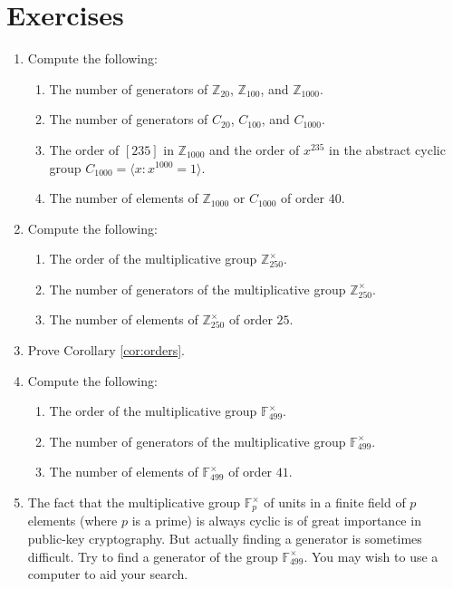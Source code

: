 \documentclass[11pt]{article}
\newenvironment{problems}
{
 \begin{enumerate}[topsep=1pt,itemsep=0pt,parsep=2pt,leftmargin=0.6cm,%
 label={\arabic*.}, ref=\arabic*] \small
}
{
 \end{enumerate}
}
\theoremstyle{definition}
\newcommand{\Z}{\mathbb{Z}} %
\newcommand{\F}{{\mathbb F}}
\newcommand{\gen}[1]{\langle #1 \rangle}
\begin{document}
\section*{Exercises}
\begin{problems}

\item Compute the following:
  \begin{enumerate}
  \item The number of generators of $\Z_{20}$, $\Z_{100}$, and
    $\Z_{1000}$.
  \item The number of generators of $C_{20}$, $C_{100}$, and
    $C_{1000}$.
  \item The order of $[235]$ in $\Z_{1000}$ and the order of $x^{235}$
    in the abstract cyclic group $C_{1000} = \gen{x: x^{1000} = 1}$.
  \item The number of elements of $\Z_{1000}$ or $C_{1000}$ of order
    $40$.
  \end{enumerate}

\item Compute the following:
  \begin{enumerate}
  \item The order of the multiplicative group $\Z_{250}^\times$.
  \item The number of generators of the multiplicative group
    $\Z_{250}^\times$.
  \item The number of elements of $\Z_{250}^\times$ of order $25$. 
  \end{enumerate}


\item Prove Corollary \ref{cor:orders}.

\item Compute the following:
  \begin{enumerate}
  \item The order of the multiplicative group $\F_{499}^\times$.
  \item The number of generators of the multiplicative group
    $\F_{499}^\times$.
  \item The number of elements of $\F_{499}^\times$ of order $41$. 
  \end{enumerate}

\item The fact that the multiplicative group $\F_p^\times$ of units in
  a finite field of $p$ elements (where $p$ is a prime) is always
  cyclic is of great importance in public-key cryptography. But
  actually finding a generator is sometimes difficult. Try to find a
  generator of the group $\F_{499}^\times$. You may wish to use a
  computer to aid your search.



\end{problems}
\end{document}
